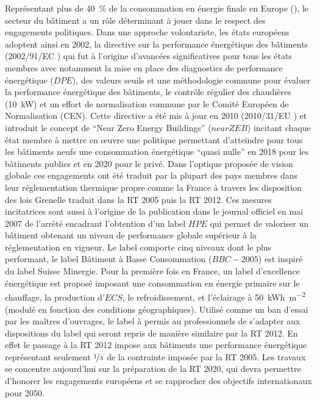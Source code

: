 Représentant plus de \SI{40}{\percent} de la consommation en énergie
finale en Europe (), le secteur du bâtiment a un rôle déterminant à
jouer dans le respect des engagements politiques. Dans une approche volontariste,
les états européens adoptent ainsi en 2002, la directive sur la performance énergétique des bâtiments
(2002/91/EC ) qui fut à l’origine
d’avancées significatives pour tous les états membres avec notamment la mise en place
des diagnostics de performance énergétique ($DPE$), des valeurs seuils et une méthodologie commune
pour évaluer la performance énergétique des bâtiments, le contrôle régulier des chaudières (\SI{+10}{kW})
et un effort de normalisation commune par le Comité Européen de Normalisation (CEN).
Cette directive a été mis à jour en 2010 (2010/31/EU ) et introduit le concept
de \enquote{Near Zero Energy Buildings} ($near ZEB$) incitant chaque état membre à mettre
en œuvre une politique permettant d’atteindre pour tous les bâtiments neufs une consommation
énergétique \enquote{quasi nulle} en 2018 pour les bâtiments publics et en 2020 pour le privé.
Dans l’optique proposée de vision globale
ces engagements ont été traduit par la plupart des pays membres dans leur réglementation
thermique propre comme la France à travers les disposition des lois Grenelle traduit dans
la RT 2005 puis la RT 2012.
Ces mesures incitatrices sont aussi à l’origine de la publication dans le journal officiel
en mai 2007 de l’arrêté encadrant l’obtention d’un label $HPE$ qui permet de valoriser
un bâtiment obtenant un niveau de performance globale supérieur à la réglementation en
vigueur. Le label comporte cinq niveaux dont le plus performant, le label Bâtiment à
Basse Consommation (\href{https://www.effinergie.org/web/index.php/les-labels-effinergie/bbc-effinergie}{$BBC-2005$})
est inspiré du label Suisse Minergie. Pour la première fois en France, un
label d’excellence énergétique est proposé imposant une consommation en énergie primaire
sur le chauffage, la production d’$ECS$, le refroidissement, et l’éclairage à
\SI{50}{kWh\per\metre\squared} (modulé en fonction des conditions géographiques).
Utilisé comme un ban d’essai par les maîtres d’ouvrages, le label à permis au professionnels
de s’adapter aux dispositions du label qui seront repris de manière similaire par la
RT 2012. En effet le passage à la RT 2012 impose aux bâtiments une performance
énergétique représentant seulement $\nicefrac{1}{3}$ de la contrainte imposée par
la RT 2005.
Les travaux se concentre aujourd’hui sur la préparation de la RT 2020, qui devra
permettre d’honorer les engagements européens et se rapprocher des objectifs internationaux
pour 2050.


